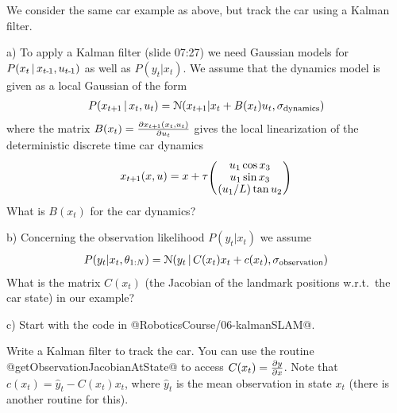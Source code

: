 
We consider the same car example as above, but track the car using a Kalman filter.

a) To apply a Kalman filter (slide 07:27) we need Gaussian models for
$P(x_t \,|\, x_{t{{\hspace*{-.0pt}\text{\rm -}\hspace*{-.5pt}}1}}, u_{t{{\hspace*{-.0pt}\text{\rm -}\hspace*{-.5pt}}1}})$ as well as $P(y_t | x_t)$.  We assume
that the dynamics model is given as a local Gaussian of the form
\begin{align*}
P(x_{t{{\hspace*{-.0pt}\text{\rm +}\hspace*{-.5pt}}1}} \,|\, x_t, u_t) = {\cal N}(x_{t{{\hspace*{-.0pt}\text{\rm +}\hspace*{-.5pt}}1}} | x_t + B(x_t) u_t, \sigma_\text{dynamics} )
\end{align*}
where the matrix $B(x_t) = \frac{\partial x_{t{{\hspace*{-.0pt}\text{\rm +}\hspace*{-.5pt}}1}}(x_t,u_t)}{\partial u_t}$
gives the local linearization of the deterministic discrete time car dynamics
$$x_{t\po}(x,u) = x + \tau \mat{c}{u_1 \cos x_3 \\ u_1 \sin x_3 \\ (u_1/L) \tan u_2}$$
What is $B(x_t)$ for the car dynamics?

b) Concerning the observation likelihood $P(y_t | x_t)$ we assume
\begin{align*}
P(y_t | x_t, \theta_{1:N}) = {\cal N}(y_t \,|\, C(x_t) x_t + c(x_t), \sigma_\text{observation})
\end{align*}
What is the matrix $C(x_t)$ (the Jacobian of the landmark positions
w.r.t.\ the car state) in our example?

c) Start with the code in @RoboticsCourse/06-kalmanSLAM@.

Write a Kalman filter to track the car. You can use the
routine @getObservationJacobianAtState@ to
access $C(x_t)=\frac{\partial y}{\partial x}$. Note that $c(x_t) = \hat y_t
- C(x_t) x_t$, where $\hat y_t$ is the mean observation in state
$x_t$ (there is another routine for this).


\exerfoot



